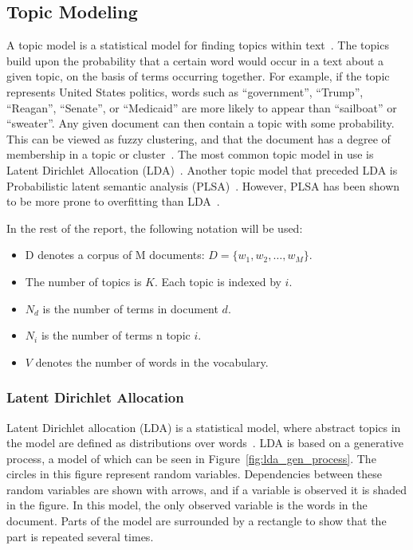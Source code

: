 \subsection{Topic Modeling}

A topic model is a statistical model for finding topics within text~\cite{crain2012dimensionality}.
The topics build upon the probability that a certain word would occur in a text about a given topic, on the basis of terms occurring together.
For example, if the topic represents United States politics, words such as ``government'', ``Trump'', ``Reagan'', ``Senate'', or ``Medicaid'' are more likely to appear than ``sailboat'' or ``sweater''.
Any given document can then contain a topic with some probability.
This can be viewed as fuzzy clustering, and that the document has a degree of membership in a topic or cluster~\cite{crain2012dimensionality}.
The most common topic model in use is Latent Dirichlet Allocation (LDA)~\cite{crain2012dimensionality}.
Another topic model that preceded LDA is Probabilistic latent semantic analysis (PLSA)~\cite{hofmann1999probabilistic}.
However, PLSA has been shown to be more prone to overfitting than LDA~\cite{crain2012dimensionality}.

In the rest of the report, the following notation will be used:

\begin{itemize}
    \item D denotes a corpus of M documents: $D = \{w_1, w_2, \ldots, w_M\}$.
    \item The number of topics is $K$. Each topic is indexed by $i$.
    \item $N_d$ is the number of terms in document $d$.
    \item $N_i$ is the number of terms n topic $i$.
    \item $V$ denotes the number of words in the vocabulary.
\end{itemize}

\subsubsection{Latent Dirichlet Allocation}

Latent Dirichlet allocation (LDA) is a statistical model, where abstract topics in the model are defined as distributions over words~\cite{blei2003latent}.
LDA is based on a generative process, a model of which can be seen in Figure~\ref{fig:lda_gen_process}.
The circles in this figure represent random variables.
Dependencies between these random variables are shown with arrows, and if a variable is observed it is shaded in the figure.
In this model, the only observed variable is the words in the document.
Parts of the model are surrounded by a rectangle to show that the part is repeated several times.

